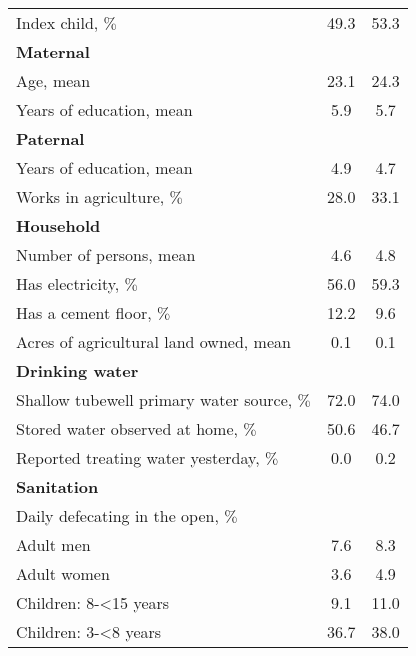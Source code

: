 \documentclass[11pt, nogin]{article}
\begin{document}
\begin{table}[!ht]
\begin{center}
\begin{tabular}{@{\extracolsep{4pt}}l c c }
 Index child, $\%$ & 49.3 & 53.3 \\ 
  \textbf{Maternal} &  &  \\ 
  \hspace{3mm}Age, mean & 23.1 & 24.3 \\ 
  \hspace{3mm}Years of education, mean & 5.9 & 5.7 \\ 
  \textbf{Paternal} &  &  \\ 
  \hspace{3mm}Years of education, mean & 4.9 & 4.7 \\ 
  \hspace{3mm}Works in agriculture, $\%$ & 28.0 & 33.1 \\ 
  \textbf{Household} &  &  \\ 
  \hspace{3mm}Number of persons, mean & 4.6 & 4.8 \\ 
  \hspace{3mm}Has electricity, $\%$ & 56.0 & 59.3 \\ 
  \hspace{3mm}Has a cement floor, $\%$ & 12.2 & 9.6 \\ 
  \hspace{3mm}Acres of agricultural land owned, mean & 0.1 & 0.1 \\ 
  \textbf{Drinking water} &  &  \\ 
  \hspace{3mm}Shallow tubewell primary water source, $\%$ & 72.0 & 74.0 \\ 
  \hspace{3mm}Stored water observed at home, $\%$ & 50.6 & 46.7 \\ 
  \hspace{3mm}Reported treating water yesterday, $\%$ & 0.0 & 0.2 \\ 
  \textbf{Sanitation} &  &  \\ 
  \hspace{3mm}Daily defecating in the open, $\%$ &  &  \\ 
  \hspace{6mm}Adult men & 7.6 & 8.3 \\ 
  \hspace{6mm}Adult women & 3.6 & 4.9 \\ 
  \hspace{6mm}Children: 8-<15 years & 9.1 & 11.0 \\ 
  \hspace{6mm}Children: 3-<8 years & 36.7 & 38.0 \\ 

\end{tabular}
\end{center}
\end{table}
\end{document}
